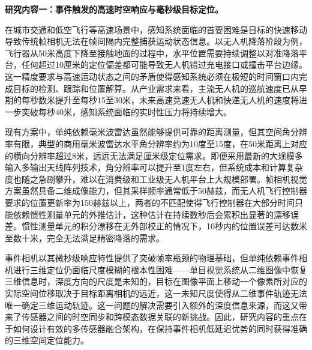 \textbf{研究内容一：事件触发的高速时空响应与毫秒级目标定位。}

在城市交通和低空飞行等高速场景中，感知系统面临的首要困难是目标的快速移动导致传统帧相机无法在帧间隔内完整捕获运动状态信息。以无人机降落阶段为例，飞行器从50米高度下降至接触地面的过程中，水平位置需要持续调整以对准降落平台，任何超过10厘米的定位偏差都可能导致无人机错过充电接口或撞击平台边缘。这一精度要求与高速运动状态之间的矛盾使得感知系统必须在极短的时间窗口内完成目标的检测、跟踪和位置解算。从产业需求来看，主流无人机的巡航速度已从早期的每秒数米提升至每秒15至30米，未来高速竞速无人机和快递无人机的速度将进一步突破每秒40米，感知系统面临的实时性压力将持续增大。

现有方案中，单纯依赖毫米波雷达虽然能够提供可靠的距离测量，但其空间角分辨率有限，典型的商用毫米波雷达水平角分辨率约为10度至15度，在50米距离上对应的横向分辨率超过8米，远远无法满足厘米级定位需求。即便采用最新的大规模多输入多输出天线阵列技术，角分辨率可以提升至1度左右，但系统成本和计算复杂度也随之急剧攀升，难以在消费级和工业级无人机平台上大规模部署。帧相机视觉方案虽然具备二维成像能力，但其采样频率通常低于50赫兹，而无人机飞行控制器要求的位置更新率为150赫兹以上，两者的不匹配使得飞行控制器在大部分时间只能依赖惯性测量单元的外推估计，这种估计在持续数秒后会累积出显著的漂移误差。惯性测量单元的积分漂移在无外部校正的情况下，10秒内的位置误差可达数米至数十米，完全无法满足精密降落的需求。

事件相机以其微秒级响应特性提供了突破帧率瓶颈的物理基础，但单纯依赖事件相机进行三维定位仍面临尺度模糊的根本性困难——单目视觉系统从二维图像中恢复三维信息时，深度方向的尺度是未知的，目标在图像平面上移动一个像素所对应的实际空间位移取决于目标距离相机的远近，这一未知尺度使得从二维事件轨迹无法唯一确定三维运动轨迹。这一问题的解决需要引入额外的深度信息来源，而这又带来了传感器之间的时空同步和跨模态数据关联的新挑战。因此，研究内容的重点在于如何设计有效的多传感器融合架构，在保持事件相机低延迟优势的同时获得准确的三维空间定位能力。

